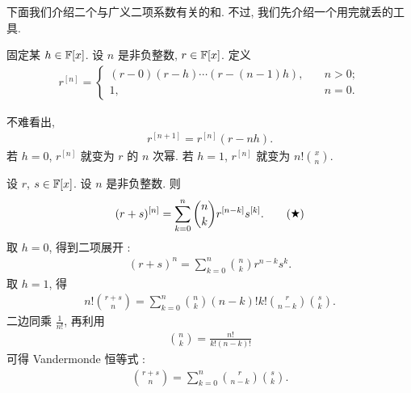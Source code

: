 下面我们介绍二个与广义二项系数有关的和. 不过, 我们先介绍一个用完就丢的工具.

\begin{definition}
    固定某 $h \in \mathbb{F}[x]$. 设 $n$ 是非负整数, $r \in \mathbb{F}[x]$. 定义
    \begin{align*}
        r^{[n]} = \begin{cases}
            (r - 0)(r - h) \cdots (r - (n-1)h), & \quad n > 0; \\
            1,                                  & \quad n = 0.
        \end{cases}
    \end{align*}
\end{definition}

不难看出,
\begin{align*}
    r^{[n+1]} = r^{[n]} (r - nh).
\end{align*}
若 $h = 0$, $r^{[n]}$ 就变为 $r$ 的 $n$ 次幂. 若 $h = 1$, $r^{[n]}$ 就变为 $n! \binom{x}{n}$.

\begin{proposition}
    设 $r$, $s \in \mathbb{F}[x]$. 设 $n$ 是非负整数. 则
    \begin{align*}
        (r + s)^{[n]} = \sum_{k = 0}^{n} \binom{n}{k} r^{[n - k]} s^{[k]}. \tag*{(\ding{72})}
    \end{align*}
    取 $h = 0$, 得到二项展开 :
    \begin{align*}
        (r + s)^{n} = \sum_{k = 0}^{n} \binom{n}{k} r^{n - k} s^{k}. \tag*{(BE)}
    \end{align*}
    取 $h = 1$, 得
    \begin{align*}
        n! \binom{r + s}{n} = \sum_{k = 0}^{n} \binom{n}{k} (n - k)! k! \binom{r}{n - k} \binom{s}{k}.
    \end{align*}
    二边同乘 $\frac{1}{n!}$, 再利用
    \begin{align*}
        \binom{n}{k} = \frac{n!}{k! (n-k)!}
    \end{align*}
    可得 Vandermonde 恒等式 :
    \begin{align*}
        \binom{r + s}{n} = \sum_{k = 0}^{n} \binom{r}{n - k} \binom{s}{k}. \tag*{(VI)}
    \end{align*}
\end{proposition}

